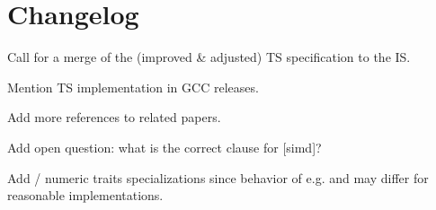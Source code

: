 \section{Changelog}
\begin{revision}
\item Call for a merge of the (improved \& adjusted) TS specification to the IS.
\item Mention TS implementation in GCC releases.
\item Add more references to related papers.
\item Add open question: what is the correct clause for [simd]?

  \todo Add  / numeric traits specializations since behavior of e.g.  and  may differ for reasonable implementations.
\end{revision}
